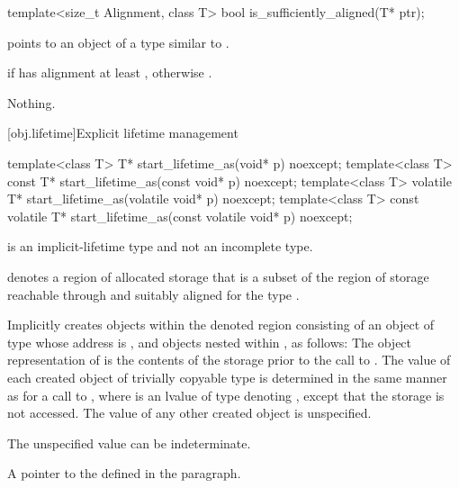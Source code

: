 %
\begin{itemdecl}
template<size_t Alignment, class T>
  bool is_sufficiently_aligned(T* ptr);
\end{itemdecl}

\begin{itemdescr}
\pnum
\expects
{} points to
an object  of a type similar to .

\pnum
\returns
{} if  has alignment at least ,
otherwise .

\pnum
\throws
Nothing.
\end{itemdescr}

[obj.lifetime]{Explicit lifetime management}

%
\begin{itemdecl}
template<class T>
  T* start_lifetime_as(void* p) noexcept;
template<class T>
  const T* start_lifetime_as(const void* p) noexcept;
template<class T>
  volatile T* start_lifetime_as(volatile void* p) noexcept;
template<class T>
  const volatile T* start_lifetime_as(const volatile void* p) noexcept;
\end{itemdecl}

\begin{itemdescr}
\pnum
\mandates
{} is an implicit-lifetime type
and not an incomplete type.

\pnum
\expects
{} denotes a region of allocated storage
that is
a subset of the region of storage
reachable through  and
suitably aligned for the type .

\pnum
\effects
Implicitly creates objects within the denoted region
consisting of an object  of type 
whose address is , and
objects nested within ,
as follows:
The object representation of 
is the contents of the storage prior to the call to .
The value of each created object 
of trivially copyable type 
is determined in the same manner as for a call
to ,
where  is an lvalue of type  denoting ,
except that the storage is not accessed.
The value of any other created object is unspecified.
\begin{note}
The unspecified value can be indeterminate.
\end{note}

\pnum
\returns
A pointer to the  defined in the  paragraph.
\end{itemdescr}

